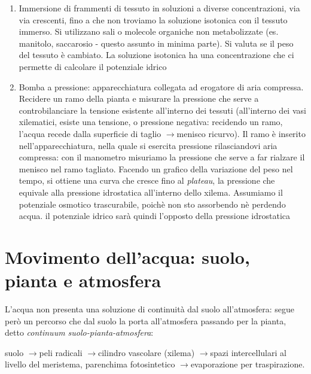 \documentclass[a4paper,12pt]{book}
\newcommand{\lfreccia}{\ensuremath{\longrightarrow}}
\begin{document}
\begin{enumerate}
\item{Immersione di frammenti di tessuto in soluzioni a diverse concentrazioni, via via crescenti, fino a che non troviamo la soluzione isotonica con il tessuto immerso. Si utilizzano sali o molecole organiche non metabolizzate (es. manitolo, saccarosio - questo assunto in minima parte).
Si valuta se il peso del tessuto è cambiato. La soluzione isotonica ha una concentrazione che ci permette di calcolare il potenziale idrico}

\item{Bomba a pressione: apparecchiatura collegata ad erogatore di aria compressa. Recidere un ramo della pianta e misurare la pressione che serve a controbilanciare la tensione esistente all'interno dei tessuti (all'interno dei vasi xilematici, esiste una tensione, o pressione negativa: recidendo un ramo, l'acqua recede dalla superficie di taglio \lfreccia menisco ricurvo).
Il ramo è inserito nell'apparecchiatura, nella quale si esercita pressione rilasciandovi aria compressa: con il manometro misuriamo la pressione che serve a far rialzare il menisco nel ramo tagliato.
Facendo un grafico della variazione del peso nel tempo, si ottiene una curva che  cresce fino al \emph{plateau}, la pressione che equivale alla pressione idrostatica all'interno dello xilema. Assumiamo il potenziale osmotico trascurabile, poichè non sto assorbendo nè perdendo acqua. il potenziale idrico sarà quindi l'opposto della pressione idrostatica}
\end{enumerate}


\chapter{Movimento dell'acqua: suolo, pianta e atmosfera}

L'acqua non presenta una soluzione di continuità dal suolo all'atmosfera: segue però un percorso che dal suolo la porta all'atmosfera passando per la pianta, detto \emph{continuum suolo-pianta-atmosfera}:

suolo \lfreccia peli radicali \lfreccia cilindro vascolare (xilema) \lfreccia spazi intercellulari al livello del meristema, parenchima fotosintetico \lfreccia evaporazione per traspirazione.
\end{document}
